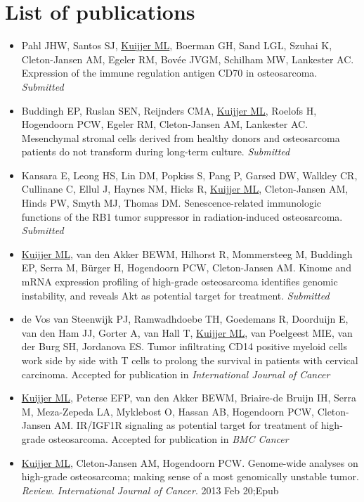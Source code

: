 \chapter{List of publications}
\thispagestyle{empty}				%
\begin{itemize} %
	\item Pahl JHW, Santos SJ, \underline{Kuijjer ML}, Boerman GH, Sand LGL, Szuhai K, Cleton-Jansen AM, Egeler RM, Bov{\'e}e JVGM, Schilham MW, Lankester AC. Expression of the immune regulation antigen CD70 in osteosarcoma. {\it Submitted}
	\item Buddingh EP, Ruslan SEN, Reijnders CMA, \underline{Kuijjer ML}, Roelofs H, Hogendoorn PCW, Egeler RM,  Cleton-Jansen AM, Lankester AC. Mesenchymal stromal cells derived from healthy donors and osteosarcoma patients do not transform during long\hyp{}term culture. {\it Submitted}
	\item Kansara E, Leong HS, Lin DM, Popkiss S, Pang P, Garsed DW, Walkley CR, Cullinane C, Ellul J, Haynes NM, Hicks R, \underline{Kuijjer ML}, Cleton-Jansen AM, Hinds PW, Smyth MJ, Thomas DM. Senescence\hyp{}related immunologic functions of the RB1 tumor suppressor in radiation\hyp{}induced osteosarcoma. {\it Submitted}
	\item \underline{Kuijjer ML}, van den Akker BEWM, Hilhorst R, Mommersteeg M, Buddingh EP, Serra M, B{\"u}rger H, Hogendoorn PCW, Cleton-Jansen AM. Kinome and mRNA expression profiling of high\hyp{}grade osteosarcoma identifies genomic instability, and reveals Akt as potential target for treatment. {\it Submitted}
	\item de Vos van Steenwijk PJ, Ramwadhdoebe TH, Goedemans R, Doorduijn E, van den Ham JJ, Gorter A, van Hall T, \underline{Kuijjer ML}, van Poelgeest MIE, van der Burg SH, Jordanova ES. Tumor infiltrating CD14 positive myeloid cells work side by side with T cells to prolong the survival in patients with cervical carcinoma. Accepted for publication in {\it International Journal of Cancer}
	\item \underline{Kuijjer ML}, Peterse EFP, van den Akker BEWM, Briaire-de Bruijn IH, Serra M, Meza-Zepeda LA, Myklebost O, Hassan AB, Hogendoorn PCW, Cleton-Jansen AM. IR/IGF1R signaling as potential target for treatment of high\hyp{}grade osteosarcoma. Accepted for publication in {\it BMC Cancer}
	\item \underline{Kuijjer ML}, Cleton-Jansen AM, Hogendoorn PCW. Genome\hyp{}wide analyses on high\hyp{}grade osteosarcoma; making sense of a most genomically unstable tumor. \emph{Review}. {\it International Journal of Cancer}. 2013 Feb 20;Epub

\end{itemize}
